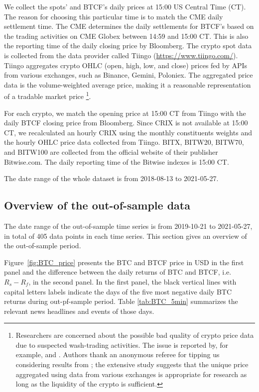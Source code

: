 \documentclass[11pt,a4paper,english]{article}
\begin{document}
We collect the spots' and BTCF's daily prices at 15:00 US Central Time
(CT). The reason for choosing this particular time is to match the CME daily settlement time.
The CME determines the daily settlements for BTCF's based on the trading
activities on CME Globex between 14:59 and 15:00 CT. This is also the
reporting time of the daily closing price by Bloomberg. 
The crypto spot data is collected from the data provider called
Tiingo (\href{https://www.tiingo.com/}{https://www.tiingo.com/}).
Tiingo aggregates crypto OHLC (open, high, low, and close) prices fed
by APIs from various exchanges, such as Binance, Gemini, Poloniex.
The aggregated price data is the volume-weighted average price, making it a
reasonable representation of a tradable market price
\footnote{
Researchers are concerned about the possible bad quality of crypto price data due to suspected wash-trading activities. 
The issue is reported by, for example, \cite{alexander2020critical} and \cite{le2021wash}. 
Authors thank an anonymous referee for tipping us considering results from \cite{vidal2022cryptocurrency};
the extensive study suggests that the unique price aggregated using data from various exchanges is appropriate for research as long as the liquidity of the crypto is sufficient. 
}.


For each crypto, we match the opening price at 15:00 CT from Tiingo
with the daily BTCF closing price from Bloomberg.
Since CRIX is not available at 15:00 CT, we recalculated an hourly
CRIX using the monthly constituents weights and the hourly OHLC price
data collected from Tiingo. 
BITX, BITW20, BITW70, and BITW100 are collected from the official
website of their publisher Bitwise.com. 
The daily reporting time of the Bitwise indexes is 15:00 CT.

The date range of the whole dataset is from 2018-08-13 to 2021-05-27. 

\subsection{Overview of the out-of-sample data}\label{subsec:oosdata}

The date range of the out-of-sample time series is from 2019-10-21 to
2021-05-27, in total of 405 data points in each time series. 
This section gives an overview of the out-of-sample period. 

Figure~\ref{fig:BTC_price} presents the BTC and BTCF price in USD in
the first panel and the difference between the daily returns of BTC and BTCF,
 i.e. $R_s - R_f$, in the second panel. 
In the first panel, the black vertical lines with capital letters
labels indicate the days of the five most negative daily BTC returns
during out-pf-sample period.
Table \ref{tab:BTC_5min} summarizes the relevant news headlines and
events of those days.  
\end{document}
